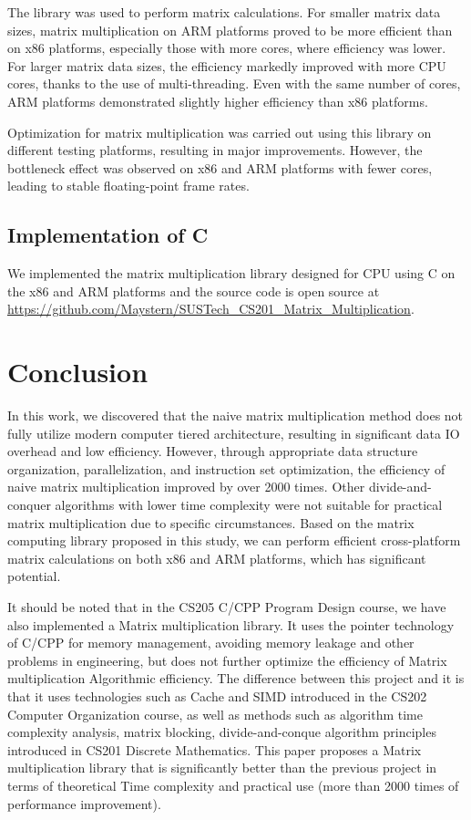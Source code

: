 \documentclass[conference]{IEEEtran}
\begin{document}
	The library was used to perform matrix calculations. For smaller matrix data sizes, matrix multiplication on ARM platforms proved to be more efficient than on x86 platforms, especially those with more cores, where efficiency was lower. For larger matrix data sizes, the efficiency markedly improved with more CPU cores, thanks to the use of multi-threading. Even with the same number of cores, ARM platforms demonstrated slightly higher efficiency than x86 platforms.
	
	Optimization for matrix multiplication was carried out using this library on different testing platforms, resulting in major improvements. However, the bottleneck effect was observed on x86 and ARM platforms with fewer cores, leading to stable floating-point frame rates.
	
	\subsection{Implementation of C}
		We implemented the matrix multiplication library designed for CPU using C on the x86 and ARM platforms and the source code is open source at \url{https://github.com/Maystern/SUSTech_CS201_Matrix_Multiplication}.
	
	\section{Conclusion}
	
	In this work, we discovered that the naive matrix multiplication method does not fully utilize modern computer tiered architecture, resulting in significant data IO overhead and low efficiency. However, through appropriate data structure organization, parallelization, and instruction set optimization, the efficiency of naive matrix multiplication improved by over 2000 times. Other divide-and-conquer algorithms with lower time complexity were not suitable for practical matrix multiplication due to specific circumstances. Based on the matrix computing library proposed in this study, we can perform efficient cross-platform matrix calculations on both x86 and ARM platforms, which has significant potential.
	
	It should be noted that in the CS205 C/CPP Program Design course, we have also implemented a Matrix multiplication library. 
	It uses the pointer technology of C/CPP for memory management, avoiding memory leakage and other problems in engineering, 
	but does not further optimize the efficiency of Matrix multiplication Algorithmic efficiency. The difference between this project and it is 
	that it uses technologies such as Cache and SIMD introduced in the CS202 Computer Organization course, 
	as well as methods such as algorithm time complexity analysis, matrix blocking, divide-and-conque algorithm principles introduced in CS201 Discrete Mathematics. This paper proposes a Matrix multiplication library that is significantly better than the previous project in terms of theoretical Time complexity and practical use (more than 2000 times of performance improvement).
\end{document}
